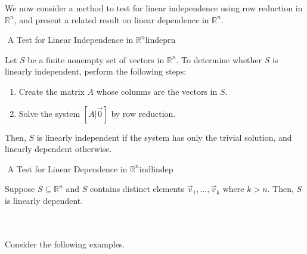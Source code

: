             We now consider a method to test for linear independence using row reduction in \(\mathbb{R}^n\), and present a related result on linear dependence in \(\mathbb{R}^n\).
            \begin{theorem}{\Stop\,\,A Test for Linear Independence in \(\mathbb{R}^n\)}{lindeprn}
                
                Let \(S\) be a finite nonempty set of vectors in \(\mathbb{R}^n\). To determine whether \(S\) is linearly independent, perform the following steps:
                \begin{enumerate}
                    \item Create the matrix \(A\) whose columns are the vectors in \(S\).
                    \item Solve the system \([A|\vec{0}]\) by row reduction.
                \end{enumerate}
                Then, \(S\) is linearly independent if the system has only the trivial solution, and linearly dependent otherwise.
            \end{theorem}
            \begin{theorem}{\Stop\,\,A Test for Linear Dependence in \(\mathbb{R}^n\)}{indlindep}

                Suppose \(S\subseteq\mathbb{R}^n\) and \(S\) contains distinct elements \(\vec{v}_1,\ldots,\vec{v}_k\) where \(k>n\). Then, \(S\) is linearly dependent.
                
            \end{theorem}
            \vphantom
            \\
            \\
            Consider the following examples.
